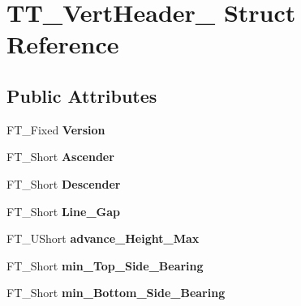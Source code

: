 \hypertarget{struct_t_t___vert_header__}{}\section{T\+T\+\_\+\+Vert\+Header\+\_\+ Struct Reference}
\label{struct_t_t___vert_header__}
\subsection*{Public Attributes}
\begin{DoxyCompactItemize}
\item 
F\+T\+\_\+\+Fixed {\bfseries Version}\hypertarget{struct_t_t___vert_header___a32d736621b757e9a39a15f2f82d15b9c}{}\label{struct_t_t___vert_header___a32d736621b757e9a39a15f2f82d15b9c}

\item 
F\+T\+\_\+\+Short {\bfseries Ascender}\hypertarget{struct_t_t___vert_header___afa95848b08d1fc8bd6bfe7e639e2895c}{}\label{struct_t_t___vert_header___afa95848b08d1fc8bd6bfe7e639e2895c}

\item 
F\+T\+\_\+\+Short {\bfseries Descender}\hypertarget{struct_t_t___vert_header___afeeb8f6c759a76d655f24f1d58f1cf35}{}\label{struct_t_t___vert_header___afeeb8f6c759a76d655f24f1d58f1cf35}

\item 
F\+T\+\_\+\+Short {\bfseries Line\+\_\+\+Gap}\hypertarget{struct_t_t___vert_header___a8a6ad9f251e12e6701ebe53d19a65aa5}{}\label{struct_t_t___vert_header___a8a6ad9f251e12e6701ebe53d19a65aa5}

\item 
F\+T\+\_\+\+U\+Short {\bfseries advance\+\_\+\+Height\+\_\+\+Max}\hypertarget{struct_t_t___vert_header___a7a2acbd1abd4cc4d6f40110203f99d0f}{}\label{struct_t_t___vert_header___a7a2acbd1abd4cc4d6f40110203f99d0f}

\item 
F\+T\+\_\+\+Short {\bfseries min\+\_\+\+Top\+\_\+\+Side\+\_\+\+Bearing}\hypertarget{struct_t_t___vert_header___a10d78594a56f0966ae1d7b60138fbec2}{}\label{struct_t_t___vert_header___a10d78594a56f0966ae1d7b60138fbec2}

\item 
F\+T\+\_\+\+Short {\bfseries min\+\_\+\+Bottom\+\_\+\+Side\+\_\+\+Bearing}\hypertarget{struct_t_t___vert_header___a21422639a4cfd8dcdc9ebb3795676292}{}\label{struct_t_t___vert_header___a21422639a4cfd8dcdc9ebb3795676292}


\end{DoxyCompactItemize}
